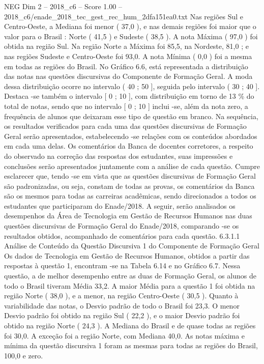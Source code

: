 \begin{textsample}{NEG Dim 2 – 2018\_c6 – Score 1.00 – 2018\_c6/enade\_2018\_tec\_gest\_rec\_hum\_2dfa151ea0.txt}
Nas regiões Sul e Centro-Oeste, a Mediana foi menor ( 37,0 ), e nas demais regiões foi maior que o valor para o Brasil : Norte ( 41,5 ) e Sudeste ( 38,5 ).
A nota Máxima ( 97,0 ) foi obtida na região Sul.
Na região Norte a Máxima foi 85,5, na Nordeste, 81,0 ; e nas regiões Sudeste e Centro-Oeste foi 93,0.
A nota Mínima ( 0,0 ) foi a mesma em todas as regiões do Brasil.
No Gráfico 6.6, está representada a distribuição das notas nas questões discursivas do Componente de Formação Geral.
A moda dessa distribuição ocorre no intervalo ( 40 ; 50 ], seguida pelo intervalo ( 30 ; 40 ].
Destaca -se também o intervalo [ 0 ; 10 ], com distribuição em torno de 13 \% do total de notas, sendo que no intervalo [ 0 ; 10 ] inclui -se, além da nota zero, a frequência de alunos que deixaram esse tipo de questão em branco.
Na sequência, os resultados verificados para cada uma das questões discursivas de Formação Geral serão apresentados, estabelecendo -se relações com os conteúdos abordados em cada uma delas.
Os comentários da Banca de docentes corretores, a respeito do observado na correção das respostas dos estudantes, suas impressões e conclusões serão apresentados juntamente com a análise de cada questão.
Cumpre esclarecer que, tendo -se em vista que as questões discursivas de Formação Geral são padronizadas, ou seja, constam de todas as provas, os comentários da Banca são os mesmos para todas as carreiras acadêmicas, sendo direcionados a todos os estudantes que participaram do Enade/2018.
A seguir, serão analisados os desempenhos da Área de Tecnologia em Gestão de Recursos Humanos nas duas questões discursivas de Formação Geral do Enade/2018, comparando -se os resultados obtidos, acompanhado de comentários para cada questão. 6.3.1.1 Análise de Conteúdo da Questão Discursiva 1 do Componente de Formação Geral Os dados de Tecnologia em Gestão de Recursos Humanos, obtidos a partir das respostas à questão 1, encontram -se na Tabela 6.14 e no Gráfico 6.7.
Nessa questão, a de melhor desempenho entre as duas de Formação Geral, os alunos de todo o Brasil tiveram Média 33,2.
A maior Média para a questão 1 foi obtida na região Norte ( 38,0 ), e a menor, na região Centro-Oeste ( 30,5 ).
Quanto à variabilidade das notas, o Desvio padrão de todo o Brasil foi 23,3.
O menor Desvio padrão foi obtido na região Sul ( 22,2 ), e o maior Desvio padrão foi obtido na região Norte ( 24,3 ).
A Mediana do Brasil e de quase todas as regiões foi 30,0.
A exceção foi a região Norte, com Mediana 40,0.
As notas máxima e mínima da questão discursiva 1 foram as mesmas para todas as regiões do Brasil, 100,0 e zero.

\end{textsample}
